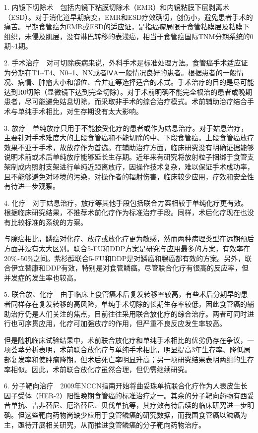 1.
内镜下切除术　包括内镜下粘膜切除术（EMR）和内镜粘膜下层剥离术（ESD）。对于消化道早期病变，EMR和ESD疗效确切，创伤小，避免患者手术的痛苦。早期食管癌为EMR或ESD的适应证，是指癌瘤局限于食管粘膜层及粘膜下组织，未侵及肌层，没有淋巴转移的表浅癌，相当于食管癌国际TNM分期系统的0期\textasciitilde{}1期。

2.
手术治疗　对可切除疾病来说，外科手术是标准处理方法。食管癌手术适应证为分期在T1\textasciitilde{}T4、N0\textasciitilde{}1、NX或者ⅣA一般情况良好的患者。根据患者的一般情况、病情、肿瘤大小和部位、合并症等选择适合的术式。手术治疗的目的是尽可能达到R0切除（显微镜下达到完全切除）。对于术前明确不能完全根治的患者或晚期患者，尽可能避免姑息切除，而采取非手术的综合治疗模式。术前辅助治疗结合手术与单纯手术相比，对生存期没有太大影响。

3.
放疗　单纯放疗只用于不能接受化疗的患者或作为姑息治疗。对于姑息治疗，主要针对手术难度大的上段食管癌和不能切除的中、下段食管癌。上段食管癌放疗效果不亚于手术，故放疗作为首选。在辅助治疗方面，临床研究没有明确证据能够说明术前或术后单纯放疗能够延长生存期。近年来有研究将放射粒子捆绑于食管支架制成内照射支架进行单纯近距离放疗，因操作技术复杂，难以保证手术成功率，且不能够避免对环境的污染，对操作者的辐射伤害，临床较少应用，疗效和安全性有待进一步观察。

4.
化疗　对于姑息治疗，放疗等其他手段包括联合方案相较于单纯化疗更有效。根据临床研究结果，不推荐术前化疗作为标准治疗手段。同样，术后化疗现在也没有比较标准的系统的方案。

与腺癌相比，鳞癌对化疗、放疗或放化疗更为敏感，然而两种病理类型在远期预后方面并没有太大区别。联合5-FU和DDP方案是研究与应用最多的方案，有效率在20\%\textasciitilde{}50\%之间。紫杉醇联合5-FU和DDP是对鳞癌和腺癌都有效的方案。另外，联合伊立替康和DDP有效，特别是对食管鳞癌。尽管联合化疗有很高的反应率，但并发症的发生率也较高。

5.
联合放、化疗　由于临床上食管癌术后复发转移率较高，有些术后分期早的患者同样存在复发转移的高风险，单纯手术切除的长期生存率较低，因此食管癌的辅助治疗仍是人们关注的焦点，目前往往采用联合放化疗的综合治疗。两者可同时进行也可序贯应用，化疗可加强放疗的作用，但严重不良反应发生率较高。

但是随机临床试验结果中，术前联合放化疗和单纯手术相比的优劣仍存在争议，一项荟萃分析表明，术前联合放化疗与单纯手术相比，明显提高3年生存率、降低局部复发率和使肿瘤降期，但术后死亡率明显升高；另一项研究结果表明两组的生存率相似。因此，术前联合放化疗虽然合理，但仍需继续研究。

6.
分子靶向治疗　2009年NCCN指南开始将曲妥珠单抗联合化疗作为人表皮生长因子受体（HER-2）阳性晚期食管癌的标准治疗之一。其余的分子靶向药物有西妥昔单抗、吉非替尼、厄洛替尼、贝伐单抗等，其疗效有待后续的临床研究进一步明确。但这些靶向药物尚缺少应用于食管鳞癌的研究数据，而我国食管癌以鳞癌为主，亟待开展相关研究，从而推进食管鳞癌的分子靶向药物治疗。

